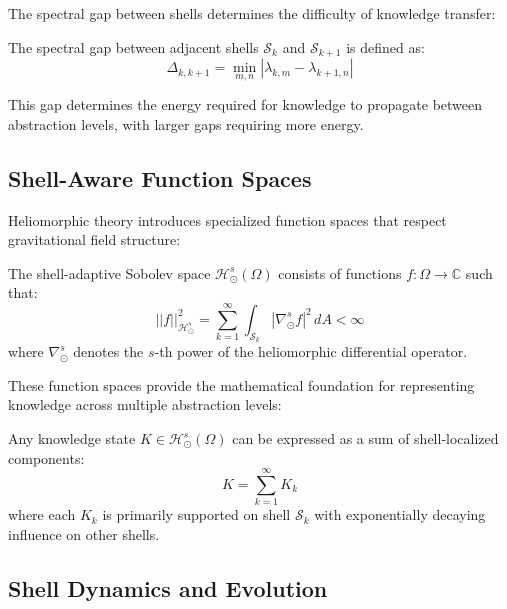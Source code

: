 The spectral gap between shells determines the difficulty of knowledge transfer:

\begin{proposition}
The spectral gap between adjacent shells $\mathcal{S}_k$ and $\mathcal{S}_{k+1}$ is defined as:
\begin{equation}
\Delta_{k,k+1} = \min_{m,n} |\lambda_{k,m} - \lambda_{k+1,n}|
\end{equation}

This gap determines the energy required for knowledge to propagate between abstraction levels, with larger gaps requiring more energy.
\end{proposition}

\subsection{Shell-Aware Function Spaces}

Heliomorphic theory introduces specialized function spaces that respect gravitational field structure:

\begin{definition}
The shell-adaptive Sobolev space $\mathcal{H}_{\odot}^s(\Omega)$ consists of functions $f: \Omega \rightarrow \mathbb{C}$ such that:
\begin{equation}
||f||_{\mathcal{H}_{\odot}^s}^2 = \sum_{k=1}^{\infty} \int_{\mathcal{S}_k} |\nabla_{\odot}^s f|^2 \, dA < \infty
\end{equation}
where $\nabla_{\odot}^s$ denotes the $s$-th power of the heliomorphic differential operator.
\end{definition}

These function spaces provide the mathematical foundation for representing knowledge across multiple abstraction levels:

\begin{theorem}
Any knowledge state $K \in \mathcal{H}_{\odot}^s(\Omega)$ can be expressed as a sum of shell-localized components:
\begin{equation}
K = \sum_{k=1}^{\infty} K_k
\end{equation}
where each $K_k$ is primarily supported on shell $\mathcal{S}_k$ with exponentially decaying influence on other shells.
\end{theorem}

\subsection{Shell Dynamics and Evolution}


